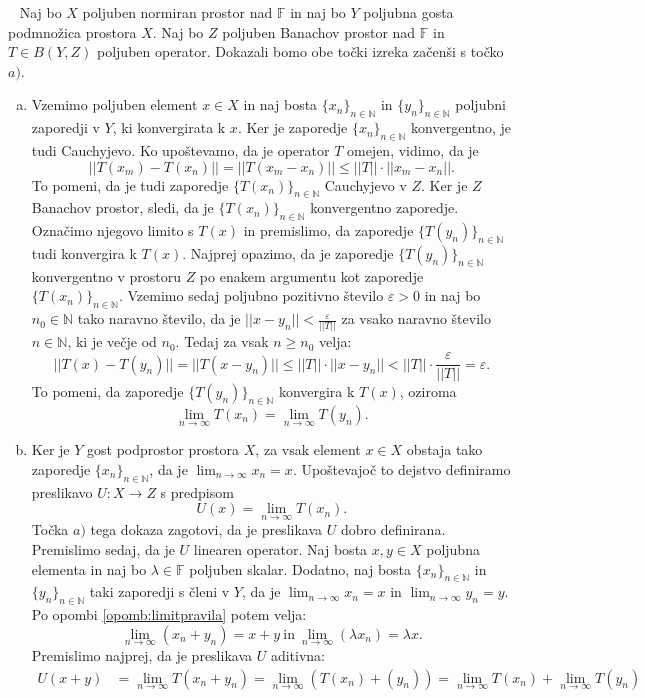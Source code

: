 \documentclass[12pt,a4paper,oneside,fleqn,openany]{book}
\newcommand{\eopf}{\raisebox{0.8ex}{\framebox{}}} %
\newenvironment{dokaz}%
{\noindent{\bf Dokaz.}\ }%
{\hfill\eopf\par\bigskip}%
\newcommand{\F}{\mathbb{F}}
\newcommand{\N}{\mathbb{N}}
\newcommand{\abs}[1]{\ensuremath{\lvert #1 \rvert}}
\newcommand{\norm}[1]{\abs{\abs{#1}}}
\newcommand{\map}[3]{\ensuremath{{#1}:{#2}\rightarrow{#3}}}
\begin{document}
\begin{dokaz}
	Naj bo $X$ poljuben normiran prostor nad $\F$ in naj bo $Y$ poljubna gosta podmnožica prostora $X$. Naj bo $Z$ poljuben Banachov prostor nad $\F$ in $T\in B(Y, Z)$ poljuben operator. Dokazali bomo obe točki izreka začenši s točko $a)$. \begin{enumerate}[a)]
		\item Vzemimo poljuben element $x\in X$ in naj bosta $\{x_n\}_{n\in\N}$ in $\{y_n\}_{n\in\N}$ poljubni zaporedji v $Y$, ki konvergirata k $x$. Ker je zaporedje $\{x_n\}_{n\in\N}$ konvergentno, je tudi Cauchyjevo. Ko upoštevamo, da je operator $T$ omejen, vidimo, da je $$\norm{T(x_m) - T(x_n)} = \norm{T(x_m - x_n)}\leq \norm{T}\cdot\norm{x_m-x_n}.$$ To pomeni, da je tudi zaporedje $\{T(x_n)\}_{n\in\N}$ Cauchyjevo v $Z$. Ker je $Z$ Banachov prostor, sledi, da je $\{T(x_n)\}_{n\in\N}$ konvergentno zaporedje. Označimo njegovo limito s $T(x)$ in premislimo, da zaporedje $\{T(y_n)\}_{n\in\N}$ tudi konvergira k $T(x)$. Najprej opazimo, da je zaporedje $\{T(y_n)\}_{n\in\N}$ konvergentno v prostoru $Z$ po enakem argumentu kot zaporedje $\{T(x_n)\}_{n\in\N}$. Vzemimo sedaj poljubno pozitivno število $\varepsilon>0$ in naj bo $n_0\in\N$ tako naravno število, da je $\norm{x-y_n}< \frac{\varepsilon}{\norm{T}}$ za vsako naravno število $n\in\N$, ki je večje od $n_0$. Tedaj za vsak $n\geq n_0$ velja: $$\norm{T(x) - T(y_n)}=\norm{T(x - y_n)}\leq\norm{T}\cdot\norm{x-y_n}<\norm{T}\cdot\frac{\varepsilon}{\norm{T}}=\varepsilon.$$ To pomeni, da zaporedje $\{T(y_n)\}_{n\in\N}$ konvergira k $T(x)$, oziroma $$\lim_{n\to \infty}T(x_n) =\lim_{n\to \infty}T(y_n).$$
		\item Ker je $Y$ gost podprostor prostora $X$, za vsak element $x\in X$ obstaja tako zaporedje $\{x_n\}_{n\in\N}$, da je $\lim_{n\to \infty}x_n = x$. Upoštevajoč to dejstvo definiramo preslikavo $\map{U}{X}{Z}$ s predpisom $$U(x)=\lim_{n\to \infty}T(x_n).$$ Točka $a)$ tega dokaza zagotovi, da je preslikava $U$ dobro definirana. Premislimo sedaj, da je $U$ linearen operator.
		Naj bosta $x, y\in X$ poljubna elementa in naj bo $\lambda\in \F$ poljuben skalar. Dodatno, naj bosta $\{x_n\}_{n\in\N}$ in $\{y_n\}_{n\in\N}$ taki zaporedji s členi v $Y$, da je $\lim_{n\to \infty}x_n = x$ in $\lim_{n\to \infty}y_n = y$. Po opombi \ref{opomb:limitpravila} potem velja: $$\lim_{n\to\infty}(x_n + y_n) = x + y~\text{in}~\lim_{n\to \infty}(\lambda x_n)=\lambda x.$$ Premislimo najprej, da je preslikava $U$ aditivna: \begin{align*}
			U(x + y) &= \lim_{n\to \infty}T(x_n + y_n) = \lim_{n\to \infty}(T(x_n) + (y_n))= \lim_{n\to \infty}T(x_n) + \lim_{n\to \infty}T(y_n) \\

\end{align*}
\end{enumerate}
\end{dokaz}
\end{document}
